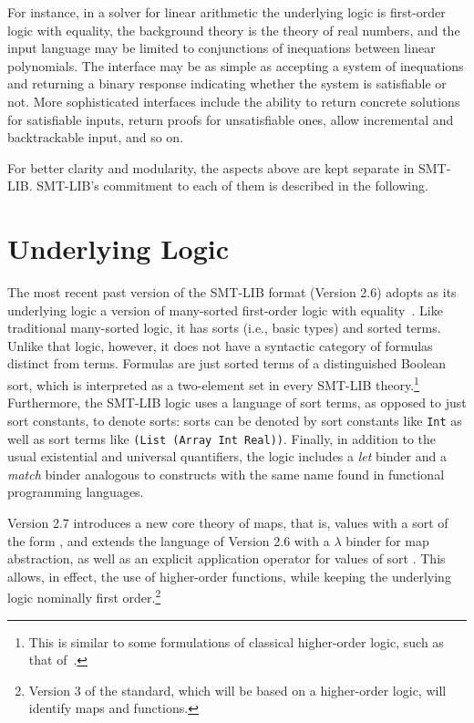 For instance, in a solver for linear arithmetic
the underlying logic is first-order logic with equality,
the background theory is the theory of real numbers, and
the input language may be limited to conjunctions of inequations 
between linear polynomials.
The interface may be as simple as accepting a system
of inequations and returning a binary response indicating 
whether the system is satisfiable or not.
More sophisticated interfaces include
the ability to return concrete solutions for satisfiable inputs,
return proofs for unsatisfiable ones,
allow incremental and backtrackable input, and so on.

For better clarity and modularity, 
the aspects above are kept separate in SMT-LIB.
SMT-LIB's commitment to each of them is described in the following.


\section{Underlying Logic}


The most recent past version of the SMT-LIB format (Version 2.6)
adopts as its underlying logic a version of many-sorted first-order logic 
with equality~\cite{Man-MSL-93,Gal-86,Hen-01}.
Like traditional many-sorted logic, it has sorts (i.e., basic types) 
and sorted terms.
Unlike that logic, however,
it does not have a syntactic category of formulas distinct from terms.
Formulas are just sorted terms of a distinguished Boolean sort,
which is interpreted as a two-element set in every SMT-LIB theory.\footnote{This is similar
to some formulations of classical higher-order logic, such as that of~\cite{andrews86}.}
Furthermore, the SMT-LIB logic uses a language of sort terms,
as opposed to just sort constants, to denote sorts:
sorts can be denoted by sort constants like \texttt{Int}
as well as sort terms like
\texttt{(List (Array Int Real))}.
Finally,
in addition to the usual existential and universal quantifiers, 
the logic includes a \emph{let} binder
and a \emph{match} binder
analogous to constructs with the same name
found in functional programming languages.

Version 2.7 introduces a new core theory of maps, 
that is, values with a sort of the form , and 
extends the language of Version 2.6 with a $\lambda$ binder
for map abstraction,
as well as an explicit application operator 
for values of sort . 
This allows, in effect, the use of higher-order functions,
while keeping the underlying logic nominally first order.\footnote{
Version 3 of the standard, which will be based on a higher-order logic,
will identify maps and functions.
}

